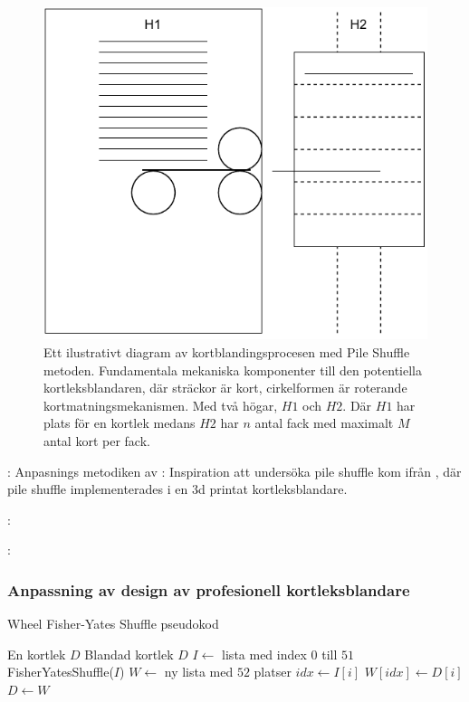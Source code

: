 \documentclass[swedish,a4paper]{article}
\begin{document}
\begin{figure}
	\centering
	\includegraphics[width=0.85\linewidth]{irl_pile_shuffle.pdf}
	\captionsetup{width=0.8\linewidth} \caption{Ett ilustrativt diagram av
		kortblandingsprocesen med 
	Pile Shuffle metoden. Fundamentala mekaniska komponenter till den potentiella
	kortleksblandaren, där sträckor är kort, cirkelformen är roterande
kortmatningsmekanismen. Med två högar, $H1$ och $H2$. Där $H1$ har plats för en
kortlek medans $H2$ har $n$ antal fack med maximalt $M$ antal kort per fack.}
	\label{fig:irl_pile}
\end{figure}
: Anpasnings metodiken av
: Inspiration att undersöka pile shuffle kom ifrån
\textcite{3DprintedLife2021},
där pile shuffle implementerades i en 3d printat kortleksblandare.  

: 



: 

\clearpage

\subsubsection{Anpassning av design av profesionell kortleksblandare}
\begin{algorithm}
\caption{Wheel Fisher-Yates Shuffle pseudokod}
\label{alg:wheel}
\begin{algorithmic}[1]
\Require En kortlek $D$
\Ensure Blandad kortlek $D$ 
\State $I \gets$ lista med index $0$ till $51$ 
\State FisherYatesShuffle($I$) 
\State $W \gets$ ny lista med $52$ platser 
    \State $idx \gets I[i]$ 
    \State $W[idx] \gets D[i]$ 
\EndFor
\State $D \gets W$ 
\end{algorithmic}
\end{algorithm}
\end{document}
